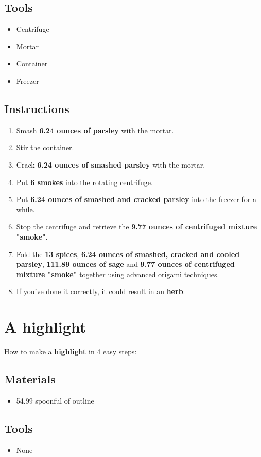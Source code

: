 \documentclass{article}
\begin{document}
\subsection{Tools}\begin{itemize}
\item 
Centrifuge
\item 
Mortar
\item 
Container
\item 
Freezer
\end{itemize}
\subsection{Instructions}\begin{enumerate}
\item 
Smash \textbf{6.24 ounces of parsley} with the mortar.
\item 
Stir the container.
\item 
Crack \textbf{6.24 ounces of smashed parsley} with the mortar.
\item 
Put \textbf{6 smokes} into the rotating centrifuge.
\item 
Put \textbf{6.24 ounces of smashed and cracked parsley} into the freezer for a while.
\item 
Stop the centrifuge and retrieve the \textbf{9.77 ounces of centrifuged mixture "smoke"}.
\item 
Fold the \textbf{13 spices}, \textbf{6.24 ounces of smashed, cracked and cooled parsley}, \textbf{111.89 ounces of sage} and \textbf{9.77 ounces of centrifuged mixture "smoke"} together using advanced origami techniques.
\item 
If you've done it correctly, it could result in an \textbf{herb}.
\end{enumerate}
\newpage
\section{A highlight}How to make a \textbf{highlight} in 4 easy steps:

\subsection{Materials}\begin{itemize}
\item 
54.99 spoonful of outline
\end{itemize}
\subsection{Tools}\begin{itemize}
\item 
None
\end{itemize}
\end{document}
